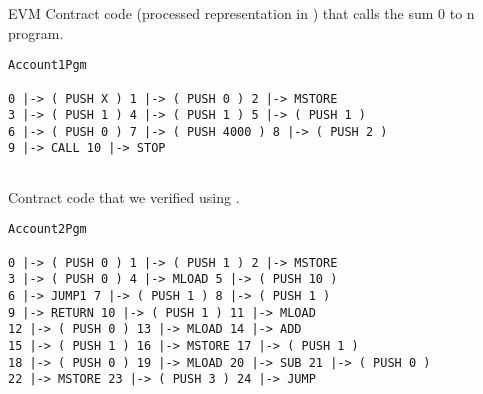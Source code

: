 \pagebreak
EVM Contract code (processed representation in \K{} ) that calls the sum 0 to n program.

\begin{verbatim}
Account1Pgm

0 |-> ( PUSH X ) 1 |-> ( PUSH 0 ) 2 |-> MSTORE 
3 |-> ( PUSH 1 ) 4 |-> ( PUSH 1 ) 5 |-> ( PUSH 1 ) 
6 |-> ( PUSH 0 ) 7 |-> ( PUSH 4000 ) 8 |-> ( PUSH 2 ) 
9 |-> CALL 10 |-> STOP 
            
\end{verbatim}
Contract code that we verified using \K{}.


\begin{verbatim}
Account2Pgm

0 |-> ( PUSH 0 ) 1 |-> ( PUSH 1 ) 2 |-> MSTORE 
3 |-> ( PUSH 0 ) 4 |-> MLOAD 5 |-> ( PUSH 10 ) 
6 |-> JUMP1 7 |-> ( PUSH 1 ) 8 |-> ( PUSH 1 ) 
9 |-> RETURN 10 |-> ( PUSH 1 ) 11 |-> MLOAD 
12 |-> ( PUSH 0 ) 13 |-> MLOAD 14 |-> ADD 
15 |-> ( PUSH 1 ) 16 |-> MSTORE 17 |-> ( PUSH 1 ) 
18 |-> ( PUSH 0 ) 19 |-> MLOAD 20 |-> SUB 21 |-> ( PUSH 0 ) 
22 |-> MSTORE 23 |-> ( PUSH 3 ) 24 |-> JUMP
\end{verbatim}
